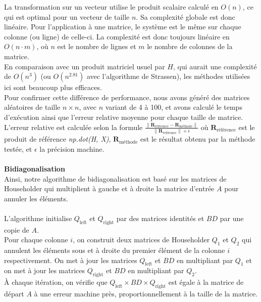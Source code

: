 \documentclass{article}
\begin{document}
La transformation sur un vecteur utilise le produit scalaire calculé en $O(n)$, ce qui est optimal pour un vecteur de taille $n$. Sa complexité globale est donc linéaire. Pour l'application à une matrice, le système est le même sur chaque colonne (ou ligne) de celle-ci. La complexité est donc toujours linéaire en $O(n \cdot m)$, où $n$ est le nombre de lignes et $m$ le nombre de colonnes de la matrice.\\
En comparaison avec un produit matriciel usuel par $H$, qui aurait une complexité de $O(n^3)$ (ou $O(n^{2.81})$ avec l'algorithme de Strassen), les méthodes utilisées ici sont beaucoup plus efficaces.\\
Pour confirmer cette différence de performance, nous avons généré des matrices aléatoires de taille \( n \times n \), avec \( n \) variant de 4 à 100, et avons calculé le temps d'exécution ainsi que l'erreur relative moyenne pour chaque taille de matrice. L'erreur relative est calculée selon la formule \(\frac{\| \mathbf{R}_{\text{référence}} - \mathbf{R}_{\text{méthode}} \|}{\| \mathbf{R}_{\text{référence}} \| + \epsilon}\) où \( \mathbf{R}_{\text{référence}} \) est le produit de référence \textit{np.dot(H, X)}, \( \mathbf{R}_{\text{méthode}} \) est le résultat obtenu par la méthode testée, et \( \epsilon \) la précision machine.\\ \\
\textbf{Bidiagonalisation}\\
Ainsi, notre algorithme de bidiagonalisation est basé sur les matrices de Householder qui multiplient à gauche et à droite la matrice d'entrée $A$ pour annuler les éléments.\\ \\
L'algorithme initialise $Q_{\text{left}}$ et $Q_{\text{right}}$ par des matrices identités et $BD$ par une copie de $A$.\\
Pour chaque colonne $i$, on construit deux matrices de Householder $Q_1$ et $Q_2$ qui annulent les éléments sous et à droite du premier élément de la colonne $i$ respectivement. On met à jour les matrices $Q_{\text{left}}$ et $BD$ en multipliant par $Q_1$ et on met à jour les matrices $Q_{\text{right}}$ et $BD$ en multipliant par $Q_2$.\\
À chaque itération, on vérifie que $Q_{\text{left}} \times BD \times Q_{\text{right}}$ est égale à la matrice de départ $A$ à une erreur machine près, proportionnellement à la taille de la matrice. 
\end{document}
